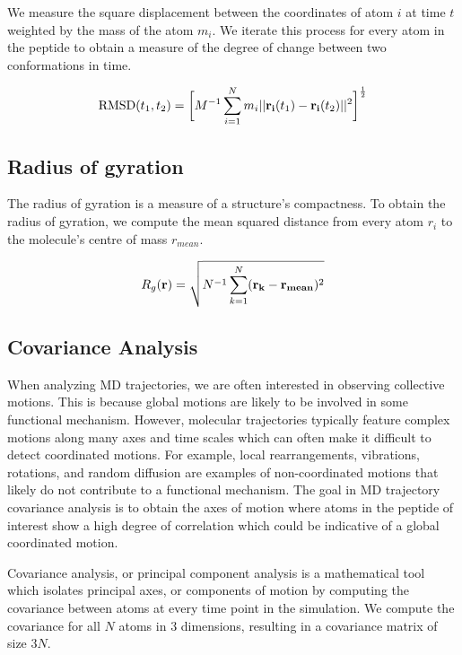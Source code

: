 We measure the square displacement between the coordinates of atom $i$ at time $t$ weighted by the mass of the atom $m_i$. We iterate this process for every atom in the peptide to obtain a measure of the degree of change between two conformations in time.

\begin{equation}
\text{RMSD}(t_1, t_2) = \bigg[ M^{-1} \sum_{i=1}^{N} m_{i} \lvert \lvert \mathbf{r_{i}}(t_{1}) - \mathbf{r_{i}}(t_{2}) \rvert \rvert^2 \bigg]^\frac{1}{2}
\end{equation}


\subsection{Radius of gyration}

The radius of gyration is a measure of a structure's compactness. To obtain the radius of gyration, we compute the mean squared distance from every atom $r_i$ to the molecule's centre of mass $r_{mean}$.

\begin{equation}
R_g(\mathbf{r}) = \sqrt{N^{-1} \sum_{k=1}^{N} (\mathbf{r_k} - \mathbf{r_{mean}})^2}
\end{equation}

\subsection{Covariance Analysis}

When analyzing MD trajectories, we are often interested in observing collective motions. This is because global motions are likely to be involved in some functional mechanism. However, molecular trajectories typically feature complex motions along many axes and time scales which can often make it difficult to detect coordinated motions. For example, local rearrangements, vibrations, rotations, and random diffusion are examples of non-coordinated motions that likely do not contribute to a functional mechanism. The goal in MD trajectory covariance analysis is to obtain the axes of motion where atoms in the peptide of interest show a high degree of correlation which could be indicative of a global coordinated motion. 

Covariance analysis, or principal component analysis is a mathematical tool which isolates principal axes, or components of motion by computing the covariance between atoms at every time point in the simulation. We compute the covariance for all $N$ atoms in $3$ dimensions, resulting in a covariance matrix of size $3N$.

